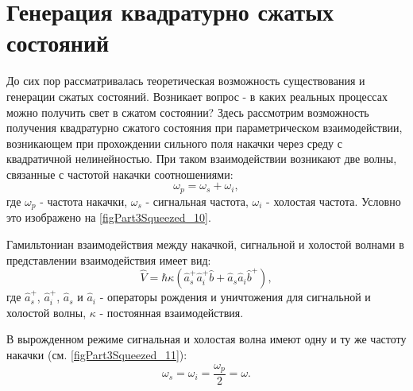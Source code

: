 \section{Генерация квадратурно сжатых состояний}
\label{pNonClassGenerSqueezed}
До сих пор рассматривалась теоретическая возможность существования и
генерации сжатых состояний. Возникает вопрос - в каких реальных
процессах можно получить свет в сжатом состоянии? Здесь рассмотрим
возможность получения квадратурно сжатого состояния при
параметрическом взаимодействии, возникающем при прохождении сильного
поля накачки через среду с квадратичной нелинейностью. При таком
взаимодействии возникают две волны, связанные с частотой накачки
соотношениями:
\begin{equation}
\omega_p = \omega_s + \omega_i,
\nonumber
\end{equation}
где $\omega_p$ - частота накачки, $\omega_s$ - сигнальная частота,
$\omega_i$ - холостая частота. Условно это изображено на 
\autoref{figPart3Squeezed_10}.




Гамильтониан взаимодействия между накачкой, сигнальной и холостой
волнами в представлении взаимодействия имеет вид:
\begin{equation}
\hat{V} = \hbar \kappa \left(
\hat{a}^{+}_s \hat{a}^{+}_i \hat{b} + 
\hat{a}_s \hat{a}_i \hat{b}^{+}
\right),
\label{eqPart3Squeezed30}
\end{equation}
где $\hat{a}^{+}_s$, $\hat{a}^{+}_i$, 
$\hat{a}_s$ и $\hat{a}_i$ - операторы рождения и уничтожения для
сигнальной и холостой волны, $\kappa$ - постоянная взаимодействия.



В вырожденном режиме сигнальная и холостая волна имеют одну и ту же
частоту накачки (см. \autoref{figPart3Squeezed_11}):
\[
\omega_s = \omega_i = \frac{\omega_p}{2} = \omega.
\]

